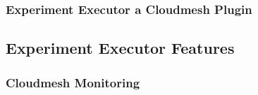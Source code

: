 \documentclass[utf8]{FrontiersinVancouver} %
\begin{document}
\subsubsection{Experiment Executor a Cloudmesh Plugin}





\subsection{Experiment Executor Features}


\citep{las-frontiers-edu}





\subsubsection{Cloudmesh Monitoring}
\label{sec:monitoring}
\end{document}
